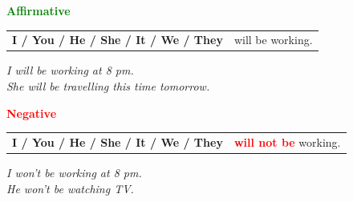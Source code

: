 \documentclass[a4paper,10pt]{article}
\newcommand{\sectiontitle}[2]{%
  {\large\bfseries\textcolor{#1}{#2}}%
}
\begin{document}
\begin{minipage}[t]{.485\textwidth}
\begin{greenbox}
  \sectiontitle{Green}{Affirmative}

  \vspace{0.75mm}
  \begin{tabular}{@{}>{\bfseries}l l@{}}
    I / You / He / She / It / We / They & will be working.\\
    
  \end{tabular}

  \vspace{0.75mm}
  \textit{I will be working at 8 pm.}\\[-1mm]
  \textit{She will be travelling this time tomorrow.}
\end{greenbox}
\end{minipage}
\hfill
\begin{minipage}[t]{.485\textwidth}
\begin{redbox}
  \sectiontitle{Red}{Negative}

  \vspace{0.75mm}
  \begin{tabular}{@{}>{\bfseries}l l@{}}
    I / You / He / She / It / We / They & \textcolor{Red}{\bfseries will not be} working.\\
    
  \end{tabular}

  \vspace{0.75mm}
  \textit{I won't be working at 8 pm.}\\[-1mm]
  \textit{He won't be watching TV.}
\end{redbox}
\end{minipage}

\vspace{1.35mm}
\end{document}
